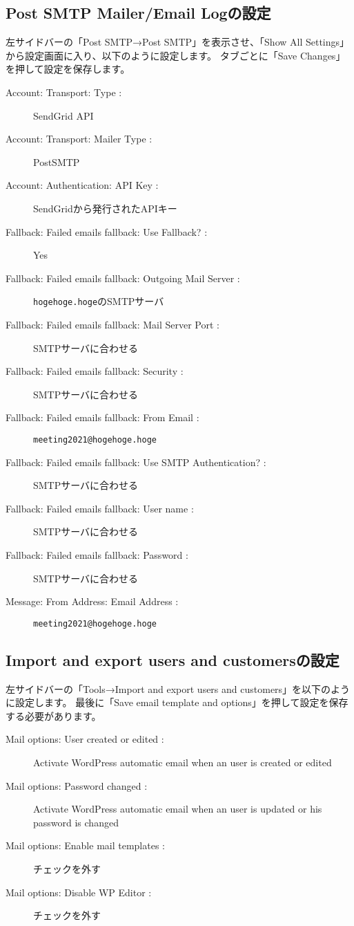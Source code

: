 \documentclass[titlepage,10pt,a4paper,uplatex]{jsbook}
\begin{document}
\subsection{Post SMTP Mailer/Email Logの設定}

左サイドバーの「Post SMTP→Post SMTP」を表示させ、「Show All Settings」から設定画面に入り、以下のように設定します。
タブごとに「Save Changes」を押して設定を保存します。

\begin{description}
\item[Account: Transport: Type : ] SendGrid API
\item[Account: Transport: Mailer Type : ] PostSMTP
\item[Account: Authentication: API Key : ] SendGridから発行されたAPIキー
\item[Fallback: Failed emails fallback: Use Fallback? : ] Yes
\item[Fallback: Failed emails fallback: Outgoing Mail Server : ] \texttt{hogehoge.hoge}のSMTPサーバ
\item[Fallback: Failed emails fallback: Mail Server Port : ] SMTPサーバに合わせる
\item[Fallback: Failed emails fallback: Security : ] SMTPサーバに合わせる
\item[Fallback: Failed emails fallback: From Email : ] \texttt{meeting2021@hogehoge.hoge}
\item[Fallback: Failed emails fallback: Use SMTP Authentication? : ] SMTPサーバに合わせる
\item[Fallback: Failed emails fallback: User name : ] SMTPサーバに合わせる
\item[Fallback: Failed emails fallback: Password : ] SMTPサーバに合わせる
\item[Message: From Address: Email Address : ] \texttt{meeting2021@hogehoge.hoge}
\end{description}

\subsection{Import and export users and customersの設定}

左サイドバーの「Tools→Import and export users and customers」を以下のように設定します。
最後に「Save email template and options」を押して設定を保存する必要があります。

\begin{description}
\item[Mail options: User created or edited : ] Activate WordPress automatic email when an user is created or edited
\item[Mail options: Password changed : ] Activate WordPress automatic email when an user is updated or his password is changed
\item[Mail options: Enable mail templates : ] チェックを外す
\item[Mail options: Disable WP Editor : ] チェックを外す
\end{description}
\end{document}
